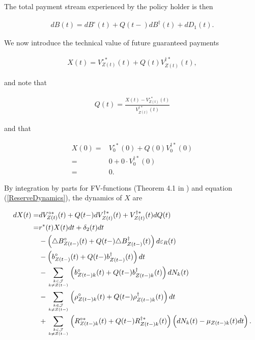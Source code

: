 \documentclass{article}
\newcommand{\1}[1]{\mathbbm{1}_{\left\lbrace #1 \right\rbrace}}
\theoremstyle{break}
\theoremstyle{remark}
\numberwithin{equation}{section}
\begin{document}
The total payment stream experienced by the policy holder is then

\begin{align} \label{WithProfitTotalBenefits}
dB(t) = dB^\circ(t) + Q(t-) dB^\dagger(t) + dD_1(t).
\end{align}

We now introduce the technical value of future guaranteed payments

\begin{align} \label{XDef}
X(t) = V_{Z(t)}^{\circ*}(t) + Q(t) V_{Z(t)}^{\dagger*}(t),
\end{align}

and note that 

\begin{align*}
	Q(t) = \frac{X(t) - V_{Z(t)}^{\circ*}(t)}{V_{Z(t)}^{\dagger*}(t)}
\end{align*}

and that

\begin{align*}
X(0) =& V_{0}^{\circ*}(0) + Q(0) V_{0}^{\dagger*}(0) \\
=& 0 + 0 \cdot V_{0}^{\dagger*}(0) \\
=& 0.
\end{align*}

By integration by parts for FV-functions (Theorem 4.1 in \cite{LivStok}) and equation (\ref{ReserveDynamics}), the dynamics of $X$ are

\begin{align} \label{XDynamics}
\begin{split}
dX(t) =& dV_{Z(t)}^{\circ*}(t) + Q(t-) dV_{Z(t)}^{\dagger*}(t) + V_{Z(t)}^{\dagger*}(t) dQ(t) \\
=& r^*(t) X(t) dt + \delta_2(t)dt \\
&- \left( \triangle B_{Z(t-)}^\circ(t) + Q(t-) \triangle B_{Z(t-)}^\dagger(t) \right) d \varepsilon_{R}(t) \\
&- \left( b_{Z(t-)}^\circ(t) + Q(t-) b_{Z(t-)}^\dagger(t) \right) dt \\
&- \sum_{k \in \mathcal{J} \atop k \neq Z(t-)} \left( b_{Z(t-)k}^\circ(t) + Q(t-) b_{Z(t-)k}^\dagger(t)\right) dN_k(t) \\
&- \sum_{k \in \mathcal{J} \atop k \neq Z(t-)} \left( \rho_{Z(t-)k}^\circ(t) + Q(t-) \rho_{Z(t-)k}^\dagger(t) \right) dt \\
&+ \sum_{k \in \mathcal{J} \atop k \neq Z(t-)} \left( R_{Z(t-)k}^{\circ*}(t) + Q(t-) R_{Z(t-)k}^{\dagger*}(t) \right) \left( dN_k(t) - \mu_{Z(t-)k}(t) dt \right).
\end{split}
\end{align}
\end{document}
